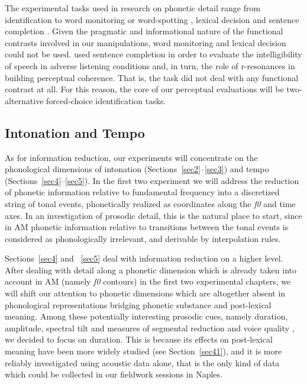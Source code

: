 The experimental tasks used in research on phonetic detail range from identification \citep{west1999perception} to word monitoring or word-spotting \citep{smith2000allophonic}, lexical decision \citep{hawkins2003effects} and sentence completion \citep{heinrich2010influence}. Given the pragmatic and informational nature of the functional contrasts involved in our manipulations, word monitoring and lexical decision could not be used. \citet{heinrich2010influence} used sentence completion in order to evaluate the intelligibility of speech in adverse listening conditions and, in turn, the role of r-resonances in building perceptual coherence. That is, the task did not deal with any functional contrast at all. For this reason, the core of our perceptual evaluations will be two-alternative forced-choice identification tasks.

\subsection{Intonation and Tempo}\label{sec132}
As for information reduction, our experiments will concentrate on the phonological dimensions of intonation (Sections~\ref{sec2}--\ref{sec3}) and tempo (Sections~\ref{sec4}--\ref{sec5}). In the first two experiment we will address the reduction of phonetic information relative to fundamental frequency into a discretized string of tonal events, phonetically realized as coordinates along the \textit{f0} and time axes. In an investigation of prosodic detail, this is the natural place to start, since in AM phonetic information relative to transitions between the tonal events is considered as phonologically irrelevant, and derivable by interpolation rules. 

Sections~\ref{sec4} and ~\ref{sec5} deal with information reduction on a higher level. After dealing with detail along a phonetic dimension which is already taken into account in AM (namely \textit{f0} contours) in the first two experimental chapters, we will shift our attention to phonetic dimensions which are altogether absent in phonological representations bridging phonetic substance and post-lexical meaning. Among these potentially interesting prosodic cues, namely duration, amplitude, \citep{shattuck1996prosody} spectral tilt and measures of segmental reduction \citep{ladd2008intonational} and voice quality \citep{campbell2003voice}, we decided to focus on duration. This is because its effects on post-lexical meaning have been more widely studied (see Section~\ref{sec41}), and it is more reliably investigated using acoustic data alone, that is the only kind of data which could be collected in our fieldwork sessions in Naples.

